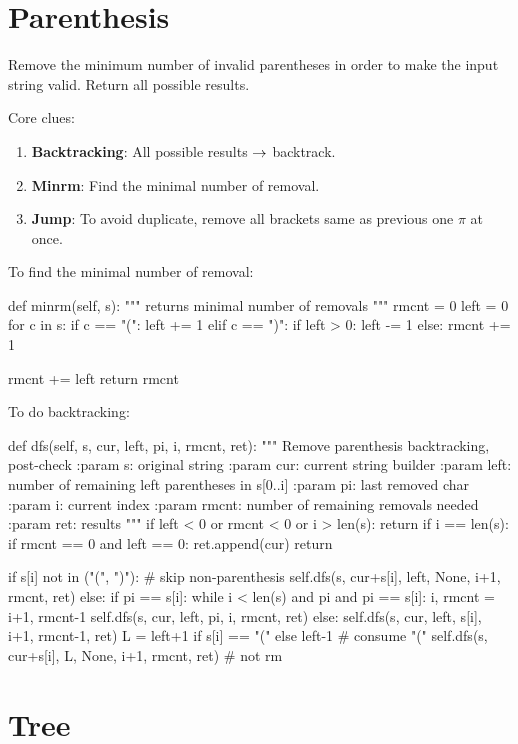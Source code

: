 \section{Parenthesis}
 Remove the minimum number of invalid parentheses in order to make the input string valid. Return all possible results.

Core clues:
\begin{enumerate}
\item \textbf{Backtracking}: All possible results $\rightarrow$ backtrack. 
\item \textbf{Minrm}: Find the minimal number of removal.
\item \textbf{Jump}: To avoid duplicate, remove all brackets same as previous one $\pi$ at once.
\end{enumerate}

To find the minimal number of removal:
\begin{python}
def minrm(self, s):
    """
    returns minimal number of removals
    """
    rmcnt = 0
    left = 0
    for c in s:
        if c == "(":
            left += 1
        elif c == ")":
            if left > 0:
                left -= 1
            else:
                rmcnt += 1

    rmcnt += left
    return rmcnt
\end{python}
To do backtracking: 
\begin{python}
def dfs(self, s, cur, left, pi, i, rmcnt, ret):
  """
  Remove parenthesis
  backtracking, post-check
  :param s: original string
  :param cur: current string builder
  :param left: number of remaining left parentheses in s[0..i]
  :param pi: last removed char
  :param i: current index
  :param rmcnt: number of remaining removals needed
  :param ret: results
  """
  if left < 0 or rmcnt < 0 or i > len(s):
    return
  if i == len(s):
    if rmcnt == 0 and left == 0:
      ret.append(cur)
    return

  if s[i] not in ("(", ")"):  # skip non-parenthesis
    self.dfs(s, cur+s[i], left, None, i+1, rmcnt, ret)
  else:
    if pi == s[i]:
      while i < len(s) and pi and pi == s[i]: 
        i, rmcnt = i+1, rmcnt-1
      self.dfs(s, cur, left, pi, i, rmcnt, ret)
    else:
      self.dfs(s, cur, left, s[i], i+1, rmcnt-1, ret)
      L = left+1 if s[i] == "(" else left-1  # consume "("
      self.dfs(s, cur+s[i], L, None, i+1, rmcnt, ret)  # not rm
\end{python}
\section{Tree}
